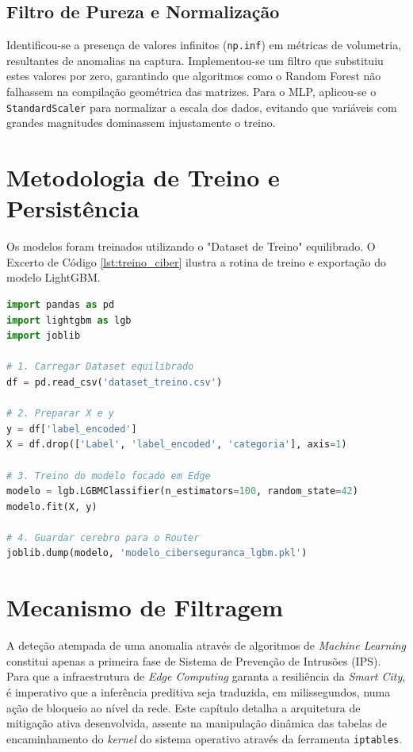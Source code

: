 \subsection{Filtro de Pureza e Normalização}
Identificou-se a presença de valores infinitos (\texttt{np.inf}) em métricas de volumetria, resultantes de anomalias na captura. Implementou-se um filtro que substituiu estes valores por zero, garantindo que algoritmos como o Random Forest não falhassem na compilação geométrica das matrizes. Para o \ac{MLP}, aplicou-se o \texttt{StandardScaler} para normalizar a escala dos dados, evitando que variáveis com grandes magnitudes dominassem injustamente o treino.


\section{Metodologia de Treino e Persistência}
\label{chap4:sec:treino}
Os modelos foram treinados utilizando o "Dataset de Treino" equilibrado. O Excerto de Código \ref{lst:treino_ciber} ilustra a rotina de treino e exportação do modelo \ac{LightGBM}.

\begin{lstlisting}[language=Python, caption={Rotina de treino e persistência do modelo LightGBM.}, label={lst:treino_ciber}]
import pandas as pd
import lightgbm as lgb
import joblib

# 1. Carregar Dataset equilibrado
df = pd.read_csv('dataset_treino.csv')

# 2. Preparar X e y
y = df['label_encoded']
X = df.drop(['Label', 'label_encoded', 'categoria'], axis=1)

# 3. Treino do modelo focado em Edge
modelo = lgb.LGBMClassifier(n_estimators=100, random_state=42)
modelo.fit(X, y)

# 4. Guardar cerebro para o Router
joblib.dump(modelo, 'modelo_ciberseguranca_lgbm.pkl')
\end{lstlisting}


\section{Mecanismo de Filtragem}
\label{chap4:sec:filtragem}

A deteção atempada de uma anomalia através de algoritmos de \textit{Machine Learning} constitui apenas a primeira fase de Sistema de Prevenção de Intrusões (IPS). Para que a infraestrutura de \textit{Edge Computing} garanta a resiliência da \textit{Smart City}, é imperativo que a inferência preditiva seja traduzida, em milissegundos, numa ação de bloqueio ao nível da rede. Este capítulo detalha a arquitetura de mitigação ativa desenvolvida, assente na manipulação dinâmica das tabelas de encaminhamento do \textit{kernel} do sistema operativo através da ferramenta \texttt{iptables}.

